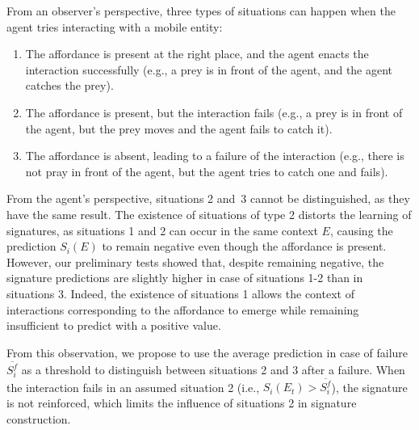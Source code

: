 \documentclass[conference]{IEEEtran}
\begin{document}
From an observer's perspective, three types of situations can happen when the agent tries interacting with a mobile entity:
\begin{enumerate}
\item The affordance is present at the right place, and the agent enacts the interaction successfully (e.g., a prey is in front of the agent, and the agent catches the prey).
\item The affordance is present, but the interaction fails (e.g., a prey is in front of the agent, but the prey moves and the agent fails to catch it).
\item The affordance is absent, leading to a failure of the interaction (e.g., there is not pray in front of the agent, but the agent tries to catch one and fails).
\end{enumerate}
From the agent's perspective, situations 2 and~3 cannot be distinguished, as they have the same result.
The existence of situations of type 2 distorts the learning of signatures, as situations 1 and 2 can occur in the same context $E$, causing the prediction $S_i(E)$ to remain negative even though the affordance is present.
However, our preliminary tests showed %
that, despite remaining negative, the signature predictions are slightly higher in case of situations 1-2 than in situations 3. Indeed, the existence of situations 1 allows the context of interactions corresponding to the affordance to emerge while remaining insufficient to predict with a positive value.

From this observation, we propose to use the average prediction in case of failure $\overline{S_i^f}$ as a threshold to distinguish between situations 2 and 3 after a failure. 
When the interaction fails in an assumed situation 2 (i.e., $S_i(E_t)>\overline{S_i^f}$), the signature is not reinforced, which limits the influence of situations 2 in signature construction. 

\end{document}
